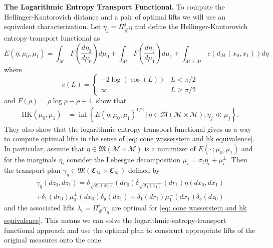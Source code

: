 \documentclass{article}
\newcommand{\man}{\mathcal{M}}
\begin{document}
\noindent \textbf{The Logarithmic Entropy Transport Functional.}
To compute the Hellinger-Kantorovich distance and a pair of optimal lifts we will use an equivalent characterization. Let $\eta_j = \Pi^j_\#\eta$ and define the Hellinger-Kantorovich entropy-transport functional as
\begin{equation} \label{eq: let functional}
    E(\eta; \mu_0, \mu_1) = \int_{\man}F\left(\frac{d\eta_0}{d\mu_0}\right)d\mu_0 + \int_{\mathbb{\man}}F\left(\frac{d\eta_1}{d\mu_1}\right)d\mu_1 + \int_{\man \times \man}c(d_{\man}(x_0, x_1))d\eta
\end{equation}
where
\begin{equation*}
    c(L) = \begin{cases}
        -2\log(\cos(L)) & L < \pi/2 \\
        \infty & L \geq \pi/2
    \end{cases}
\end{equation*}
and $F(\rho) = \rho\log\rho - \rho + 1.$ \citet{liero2016optimal} show that 
\begin{align} \label{eq: let hk equivalence}
    \text{HK}(\mu_0, \mu_1) &= \inf\left\{E(\eta;\mu_0, \mu_1)^{1/2} \, |\, \eta  \in \mathfrak{M}(\man \times \man), \eta_j  \ll \mu_j\right\}.
\end{align}
They also show that the logarithmic entropy transport functional gives us a way to compute optimal lifts in the sense of \cref{eq: cone wasserstein and hk equivalence}. In particular, assume that $\eta \in \mathfrak{M}(\man \times \man)$ is a minimizer of $E(\cdot\,; \mu_0, \mu_1)$ and for the marginals $\eta_i$ consider the Lebesgue decomposition $\mu_i = \sigma_i\eta_i + \mu_i^\perp$. Then the transport plan $\gamma_{\eta} \in \mathfrak{M}(\mathfrak{C}_{\man} \times \mathfrak{C}_{\man})$ defined by
\begin{multline}\label{eq: optimal lift}
    \gamma_{\eta}(dz_0, dz_1) = \delta_{\sqrt{\sigma_0(x_0)}}(dr_0)\delta_{\sqrt{\sigma_1(x_1)}}(dr_1)\eta(dx_0, dx_1) \\
    + \delta_1(dr_0)\mu_0^\perp(dx_0)\delta_{\mathfrak{o}}(dz_1) + \delta_1(dr_1)\mu_1^\perp(dx_1)\delta_{\mathfrak{o}}(dz_0) 
\end{multline}
and the associated lifts $\lambda_i = \Pi_{\#}^i\gamma_\eta$ are optimal for \cref{eq: cone wasserstein and hk equivalence}. This means we can solve the logarithmic-entropy-transport functional approach and use the optimal plan to construct appropriate lifts of the original measures onto the cone. 
\end{document}
